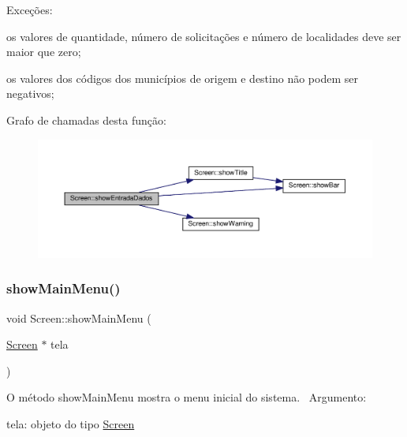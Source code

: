 Exceções\+:
\begin{DoxyItemize}
\item os valores de quantidade, número de solicitações e número de localidades deve ser maior que zero;
\item os valores dos códigos dos municípios de origem e destino não podem ser negativos;
\end{DoxyItemize}Grafo de chamadas desta função\+:\nopagebreak
\begin{figure}[H]
\begin{center}
\leavevmode
\includegraphics[width=350pt]{classScreen_a7b425f6ea8830066c837f84e09f493a0_cgraph}
\end{center}
\end{figure}
\mbox{\label{classScreen_a3ea61b376ace3fa90b16ba31b01a8107}} 
\subsubsection{\texorpdfstring{show\+Main\+Menu()}{showMainMenu()}}
{\footnotesize\ttfamily void Screen\+::show\+Main\+Menu (\begin{DoxyParamCaption}\item[{\hyperlink{classScreen}{Screen} $\ast$}]{tela }\end{DoxyParamCaption})}

O método show\+Main\+Menu mostra o menu inicial do sistema.~\newline
Argumento\+:
\begin{DoxyItemize}
\item tela\+: objeto do tipo \hyperlink{classScreen}{Screen}
\end{DoxyItemize}


